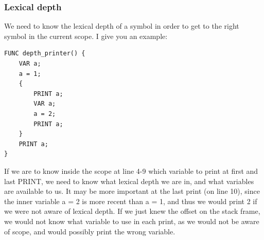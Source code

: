 \documentclass[english,a4paper]{scrartcl}
\begin{document}
\subsubsection{Lexical depth}
We need to know the lexical depth of a symbol in order to get to the right
symbol in the current scope. I give you an example:
\begin{lstlisting}[language=vsl]
FUNC depth_printer() {
	VAR a;
	a = 1;
	{
		PRINT a;
		VAR a;
		a = 2;
		PRINT a;
	}
	PRINT a;
}
\end{lstlisting}
If we are to know inside the scope at line 4-9 which variable to print at first
and last {\ttfamily PRINT}, we need to know what lexical depth we are in, and
what variables are available to us. It may be more important at the last print
(on line 10), since the inner variable {\ttfamily a = 2} is more recent than
{\ttfamily a = 1}, and thus we would print 2 if we were not aware of lexical
depth. If we just knew the offset on the stack frame, we would not know what
variable to use in each print, as we would not be aware of scope, and would
possibly print the wrong variable.
\printindex
\end{document}
